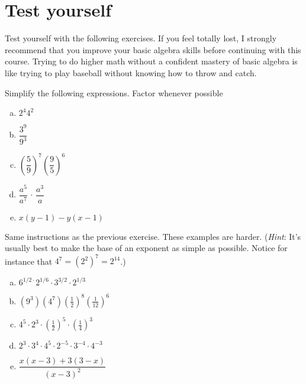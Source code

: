 \section{Test yourself}
Test yourself with the following exercises. If you feel totally lost, I strongly recommend that you improve your basic algebra skills before continuing with this course. Trying to do higher math without a confident mastery of basic algebra is like trying to play baseball without knowing how to throw and catch.

\begin{exercise}{7}
Simplify the following expressions. Factor whenever possible
\begin{multicols}{2}
\begin{enumerate}[(a)]
\item
$ 2^4 4^2$
\item
$ \dfrac{3^9}{9^3}$
\item
$\left( \dfrac{5}{9} \right)^7 \left( \dfrac{9}{5} \right)^6$
\item
$\dfrac{a^5}{a^7} \, \cdot \, \dfrac{a^3}{a}$
\item
$x(y-1) - y(x-1)$
\end{enumerate}
\end{multicols}
\end{exercise}


\begin{exercise}{8}
Same instructions as the previous exercise. These examples are  harder. (\emph{Hint}: It's usually best to make the base of an exponent as simple as possible. Notice for instance that $4^7 = (2^2)^7 = 2^{14}$.)
\begin{multicols}{2}
\begin{enumerate}[(a)]
\item
$6^{1/2\cdot}2^{1/6}\cdot3^{3/2}\cdot2^{1/3}$
\item
$(9^3)(4^7)\left(\frac{1}{2}\right)^8\left(\frac{1}{12}\right)^6$
\item
$4^5 \cdot 2^3 \cdot \left(\frac{1}{2}\right)^5 \cdot \left( \frac{1}{4} \right) ^3$
\item
$2^3 \cdot 3^4 \cdot 4^5 \cdot 2^{-5} \cdot 3^{-4} \cdot 4^{-3}$
\item
$\dfrac{x(x-3)+3(3-x)}{(x-3)^2}$
\end{enumerate}
\end{multicols}
\end{exercise}


